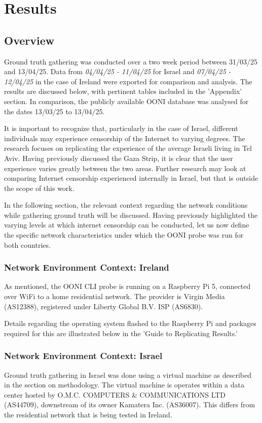 \chapter{Results}
\section{Overview}
Ground truth gathering was conducted over a two week period between 31/03/25 and 13/04/25. Data from \textit{04/04/25 - 11/04/25} for Israel and \textit{07/04/25 - 12/04/25} in the case of Ireland were exported for comparison and analysis. The results are discussed below, with pertinent tables included in the 'Appendix' section. In comparison, the publicly available OONI database was analysed for the dates 13/03/25 to 13/04/25. 

It is important to recognize that, particularly in the case of Israel, different individuals may experience censorship of the Internet to varying degrees. The research focuses on replicating the experience of the average Israeli living in Tel Aviv. Having previously discussed the Gaza Strip, it is clear that the user experience varies greatly between the two areas. Further research may look at comparing Internet censorship experienced internally in Israel, but that is outside the scope of this work.

In the following section, the relevant context regarding the network conditions while gathering ground truth will be discussed. Having previously highlighted the varying levels at which internet censorship can be conducted, let us now define the specific network characteristics under which the OONI probe was run for both countries.

\subsection{Network Environment Context: Ireland}
As mentioned, the OONI CLI probe is running on a Raspberry Pi 5, connected over WiFi to a home residential network. The provider is Virgin Media (AS12388), registered under Liberty Global B.V. ISP (AS6830). 

Details regarding the operating system flashed to the Raspberry Pi and packages required for this are illustrated below in the 'Guide to Replicating Results.' 

\subsection{Network Environment Context: Israel}
Ground truth gathering in Israel was done using a virtual machine as described in the section on methodology. The virtual machine is operates within a data center hosted by O.M.C. COMPUTERS \& COMMUNICATIONS LTD (AS44709), downstream of its owner Kamatera Inc. (AS36007). This differs from the residential network that is being tested in Ireland.


